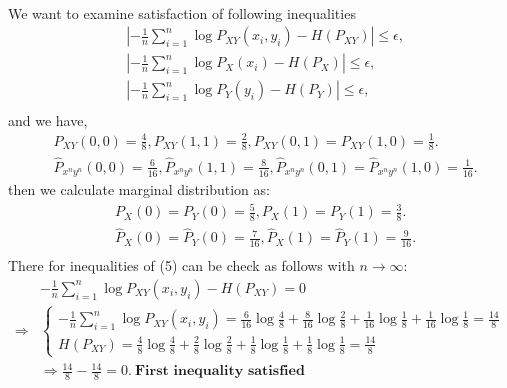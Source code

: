 \documentclass[
  course = {{EE623 Information Theory}},
  quartile = {{Fall 2020}},
  assignment = 6,
  name = {{Mohammad Mahdi Rahimi}},
  studentnumber = {{20208244}},
  email = {{mahi@kaist.ac.kr}},
  firstexercise = 1
]{aga-homework}
\begin{document}
\\
\exercise
\\\\
We want to examine satisfaction of following inequalities
\begin{equation} \label{eq3}
\begin{split}
&\left|- \frac{1}{n} \sum_{i=1}^{n} \log{P_{XY}(x_i, y_i)} - H(P_{XY})\right| \le \epsilon,\\
&\left| - \frac{1}{n} \sum_{i=1}^{n} \log{P_X(x_i)} - H(P_X)\right| \le \epsilon,\\
&\left| - \frac{1}{n} \sum_{i=1}^{n} \log{P_Y(y_i)} - H(P_Y)\right| \le \epsilon,\\
\end{split}
\end{equation}
and we have,
\begin{equation} \label{eq3}
\begin{split}
& P_{XY}(0,0) = \frac{4}{8},P_{XY}(1,1) = \frac{2}{8},P_{XY}(0,1) = P_{XY}(1,0) = \frac{1}{8}. \\
& \hat{P}_{x^ny^n}(0,0) = \frac{6}{16},\hat{P}_{x^ny^n}(1,1) = \frac{8}{16},\hat{P}_{x^ny^n}(0,1) = \hat{P}_{x^ny^n}(1,0) = \frac{1}{16}. 
\end{split}
\end{equation}
then we calculate marginal distribution as:
\begin{equation} \label{eq3}
\begin{split}
& P_{X}(0) = P_{Y}(0) = \frac{5}{8},P_{X}(1) = P_{Y}(1) = \frac{3}{8}. \\
& \hat{P}_{X}(0) = \hat{P}_{Y}(0) = \frac{7}{16},\hat{P}_{X}(1) = \hat{P}_{Y}(1) = \frac{9}{16}. \\
\end{split}
\end{equation}
There for inequalities of (5) can be check as follows with $n \rightarrow \infty$:
\begin{equation} \label{eq3}
\begin{split}
& -\frac{1}{n} \sum_{i=1}^{n} \log{P_{XY}(x_i, y_i)} - H(P_{XY}) = 0 \\
\Rightarrow & \begin{cases}
-\frac{1}{n} \sum_{i=1}^{n} \log{P_{XY}(x_i, y_i)} = \frac{6}{16}\log\frac{4}{8} + \frac{8}{16}\log\frac{2}{8} + \frac{1}{16}\log\frac{1}{8} + \frac{1}{16}\log\frac{1}{8} = \frac{14}{8}\\
H(P_{XY}) = \frac{4}{8}\log\frac{4}{8} + \frac{2}{8}\log\frac{2}{8} + \frac{1}{8}\log\frac{1}{8} + \frac{1}{8}\log\frac{1}{8} = \frac{14}{8}
\end{cases}\\
& \Rightarrow \frac{14}{8} - \frac{14}{8} = 0.\ \textbf{First inequality satisfied}
\end{split}
\end{equation}
\end{document}
